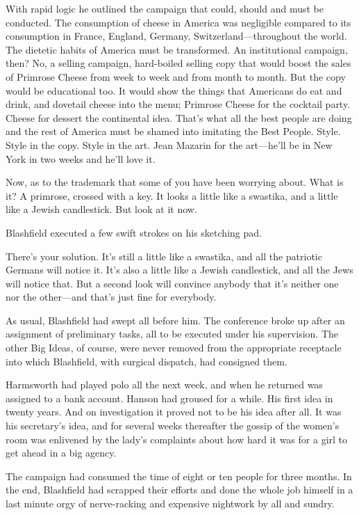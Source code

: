 \documentclass[nohyper,openany,nobib]{tufte-book}
\begin{document}
With rapid logic he outlined the campaign that could, should and must be
conducted. The consumption of cheese in America was negligible compared
to its consumption in France, England, Germany, Switzerland---throughout
the world. The dietetic habits of America must be transformed. An
institutional campaign, then? No, a selling campaign, hard-boiled
selling copy that would boost the sales of Primrose Cheese from week to
week and from month to month. But the copy would be educational too. It
would show the things that Americans do eat and drink, and dovetail
cheese into the menu; Primrose Cheese for the cocktail party. Cheese for
dessert the continental idea. That's what all the best people are doing
and the rest of America must be shamed into imitating the Best People.
Style. Style in the copy. Style in the art. Jean Mazarin for the
art---he'll be in New York in two weeks and he'll love it.

Now, as to the trademark that some of you have been worrying about. What
is it? A primrose, crossed with a key. It looks a little like a
swastika, and a little like a Jewish candlestick. But look at it now.

Blashfield executed a few swift strokes on his sketching pad.

There's your solution. It's still a little like a swastika, and all the
patriotic Germans will notice it. It's also a little like a Jewish
candlestick, and all the Jews will notice that. But a second look will
convince anybody that it's neither one nor the other---and that's just
fine for everybody.

As usual, Blashfield had swept all before him. The conference broke up
after an assignment of preliminary tasks, all to be executed under his
supervision. The other Big Ideas, of course, were never removed from the
appropriate receptacle into which Blashfield, with surgical dispatch,
had consigned them.

Harmsworth had played polo all the next week, and when he returned was
assigned to a bank account. Hanson had groused for a while. His first
idea in twenty years. And on investigation it proved not to be his idea
after all. It was his secretary's idea, and for several weeks thereafter
the gossip of the women's room was enlivened by the lady's complaints
about how hard it was for a girl to get ahead in a big agency.

The campaign had consumed the time of eight or ten people for three
months. In the end, Blashfield had scrapped their efforts and done the
whole job himself in a last minute orgy of nerve-racking and expensive
nightwork by all and sundry.
\end{document}
